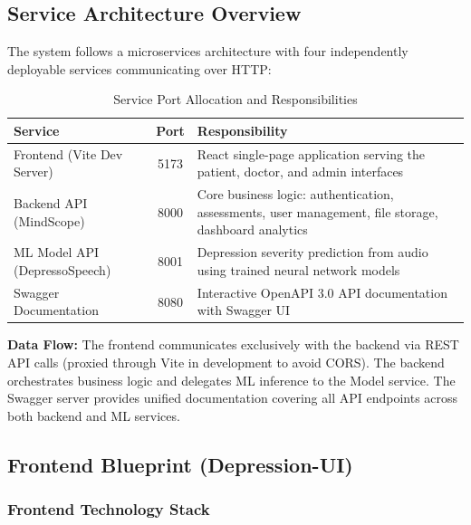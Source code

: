 \documentclass[12pt]{article}
\begin{document}

	\subsection{Service Architecture Overview}

	The system follows a microservices architecture with four independently deployable services communicating over HTTP:

	\begin{table}[H]
		\centering
		\caption{Service Port Allocation and Responsibilities}
		\begin{tabular}{|l|c|p{8cm}|}
			\hline
			\textbf{Service} & \textbf{Port} & \textbf{Responsibility} \\ \hline
			Frontend (Vite Dev Server) & 5173 & React single-page application serving the patient, doctor, and admin interfaces \\ \hline
			Backend API (MindScope) & 8000 & Core business logic: authentication, assessments, user management, file storage, dashboard analytics \\ \hline
			ML Model API (DepressoSpeech) & 8001 & Depression severity prediction from audio using trained neural network models \\ \hline
			Swagger Documentation & 8080 & Interactive OpenAPI 3.0 API documentation with Swagger UI \\ \hline
		\end{tabular}
	\end{table}

	\textbf{Data Flow:} The frontend communicates exclusively with the backend via REST API calls (proxied through Vite in development to avoid CORS). The backend orchestrates business logic and delegates ML inference to the Model service. The Swagger server provides unified documentation covering all API endpoints across both backend and ML services.


	\subsection{Frontend Blueprint (Depression-UI)}

	\subsubsection{Frontend Technology Stack}
\end{document}
